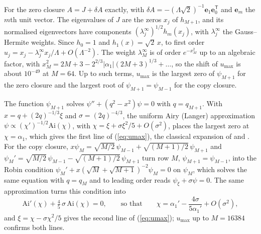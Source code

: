 For the zero closure $A=J+\delta A$ exactly, with $\delta A=-(\Lambda\sqrt2)^{-1}\boldsymbol e_1\boldsymbol e_0^{\mathsf T}$ and $\boldsymbol e_m$ the $m$th unit vector. The eigenvalues of $J$ are the zeros $x_j$ of $h_{M+1}$, and its normalised eigenvectors have components $(\lambda^\infty_j)^{1/2}h_m(x_j)$, with $\lambda^\infty_j$ the Gauss--Hermite weights. Since $h_0=1$ and $h_1(x)=\sqrt2\,x$, to first order $u_j=x_j-\lambda^\infty_jx_j/\Lambda+O(\Lambda^{-2})$. The weight $\lambda^\infty_M$ is of order $e^{-x_M^2}$ up to an algebraic factor, with $x_M^2=2M+3-2^{2/3}|\alpha_1|(2M+3)^{1/3}+\dots$, so the shift of $u_{\max}$ is about $10^{-49}$ at $M=64$. Up to such terms, $u_{\max}$ is the largest zero of $\psi_{M+1}$ for the zero closure and the largest root of $\psi_{M+1}=\psi_{M-1}$ for the copy closure.

The function $\psi_{M+1}$ solves $\psi''+(q^2-x^2)\psi=0$ with $q=q_{M+1}$. With $x=q+(2q)^{-1/3}\xi$ and $\sigma=(2q)^{-4/3}$, the uniform Airy (Langer) approximation $\psi\propto(\chi')^{-1/2}\mathrm{Ai}(\chi)$, with $\chi=\xi+\sigma\xi^2/5+O(\sigma^2)$, places the largest zero at $\chi=\alpha_1$, which gives the first line of (\ref{eq:umax}), the classical expansion of \citet[theorem~6.32]{Szego1975} and \citet{Olver1959} \citep[eq.~12.11.9]{DLMF}. For the copy closure, $x\psi_M=\sqrt{M/2}\,\psi_{M-1}+\sqrt{(M+1)/2}\,\psi_{M+1}$ and $\psi_M'=\sqrt{M/2}\,\psi_{M-1}-\sqrt{(M+1)/2}\,\psi_{M+1}$ turn row $M$, $\psi_{M+1}=\psi_{M-1}$, into the Robin condition $\psi_M'+x(\sqrt M+\sqrt{M+1})^{-2}\psi_M=0$ on $\psi_M$, which solves the same equation with $q=q_M$ and to leading order reads $\psi_\xi+\sigma\psi=0$. The same approximation turns this condition into
\begin{equation*}
  \mathrm{Ai}'(\chi)+\tfrac45\,\sigma\,\mathrm{Ai}(\chi)=0,\qquad\text{so that}\qquad \chi=\alpha_1'-\frac{4\sigma}{5\alpha_1'}+O(\sigma^2),
\end{equation*}
and $\xi=\chi-\sigma\chi^2/5$ gives the second line of (\ref{eq:umax}); $u_{\max}$ up to $M=16384$ confirms both lines.

